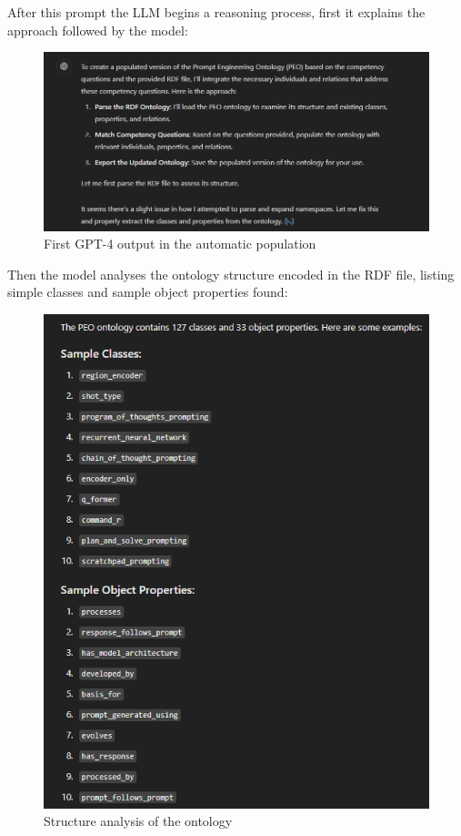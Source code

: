 After this prompt the LLM begins a reasoning process, first it explains the approach followed by the model:
\begin{figure}[H]
    \centering
    \includegraphics[width=0.9\linewidth]{Figures/fig_35.png}
    \caption{First GPT-4 output in the automatic population}
    \label{fig:enter-label}
\end{figure}
Then the model analyses the ontology structure encoded in the RDF file, listing simple classes and sample object properties found:
\begin{figure}[H]
    \centering
    \includegraphics[width=0.85\linewidth]{Figures/fig_36.png}
    \caption{Structure analysis of the ontology}
    \label{fig:enter-label}
\end{figure}
